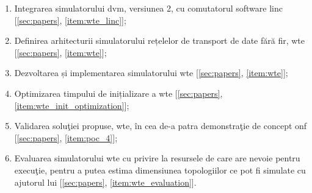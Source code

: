 \begin{enumerate}
	\item Integrarea simulatorului \gls{dvm}, versiunea 2, cu comutatorul software \gls{linc} [\ref{sec:papers}, \ref{item:wte_linc}];
	
	\item Definirea arhitecturii simulatorului rețelelor de transport de date fără fir, \gls{wte} [\ref{sec:papers}, \ref{item:wte}];
	
	\item Dezvoltarea și implementarea simulatorului \gls{wte} [\ref{sec:papers}, \ref{item:wte}];
	
	\item Optimizarea timpului de inițializare a \gls{wte} [\ref{sec:papers}, \ref{item:wte_init_optimization}];
	
	\item Validarea soluţiei propuse, \gls{wte}, în cea de-a patra demonstraţie de concept \gls{onf} [\ref{sec:papers}, \ref{item:poc_4}];
	
	\item Evaluarea simulatorului \gls{wte} cu privire la resursele de care are nevoie pentru execuţie, pentru a putea estima dimensiunea topologiilor ce pot fi simulate cu ajutorul lui [\ref{sec:papers}, \ref{item:wte_evaluation}].
\end{enumerate}